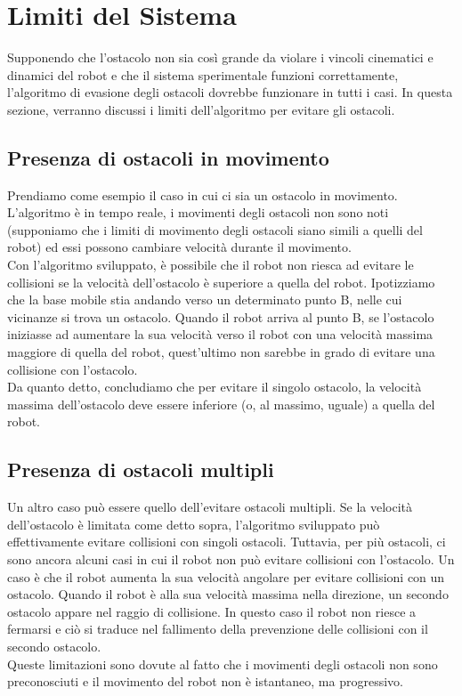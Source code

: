 \section{Limiti del Sistema}

Supponendo che l'ostacolo non sia così grande da violare i vincoli cinematici e dinamici del robot e che il sistema sperimentale funzioni correttamente, l'algoritmo di evasione degli ostacoli dovrebbe funzionare in tutti i casi. In questa sezione, verranno discussi i limiti dell’algoritmo per evitare gli ostacoli. 

\subsection{Presenza di ostacoli in movimento}
Prendiamo come esempio il caso in cui ci sia un ostacolo in movimento.\\
L'algoritmo è in tempo reale, i movimenti degli ostacoli non sono noti (supponiamo che i limiti di movimento degli ostacoli siano simili a quelli del robot) ed essi possono cambiare velocità durante il movimento.\\
Con l'algoritmo sviluppato, è possibile che il robot non riesca ad evitare le collisioni se la velocità dell'ostacolo è superiore a quella del robot. Ipotizziamo che la base mobile stia andando verso un determinato punto B, nelle cui vicinanze si trova un ostacolo. Quando il robot arriva al punto B, se l'ostacolo iniziasse ad aumentare la sua velocità verso il robot con una velocità massima maggiore di quella del robot, quest'ultimo non sarebbe in grado di evitare una collisione con l'ostacolo.\\
Da quanto detto, concludiamo che per evitare il singolo ostacolo, la velocità massima dell'ostacolo deve essere inferiore (o, al massimo, uguale) a quella del robot.
\subsection{Presenza di ostacoli multipli}
Un altro caso può essere quello dell’evitare ostacoli multipli. Se la velocità dell'ostacolo è limitata come detto sopra, l'algoritmo sviluppato può effettivamente evitare collisioni con singoli ostacoli. Tuttavia, per più ostacoli, ci sono ancora alcuni casi in cui il robot non può evitare collisioni con l'ostacolo. Un caso è che il robot aumenta la sua velocità angolare per evitare collisioni con un ostacolo. Quando il robot è alla sua velocità massima nella direzione, un secondo ostacolo appare nel raggio di collisione. In questo caso il robot non riesce a fermarsi e ciò si traduce nel fallimento della prevenzione delle collisioni con il secondo ostacolo. \\
Queste limitazioni sono dovute al fatto che i movimenti degli ostacoli non sono preconosciuti e il movimento del robot non è istantaneo, ma progressivo.
